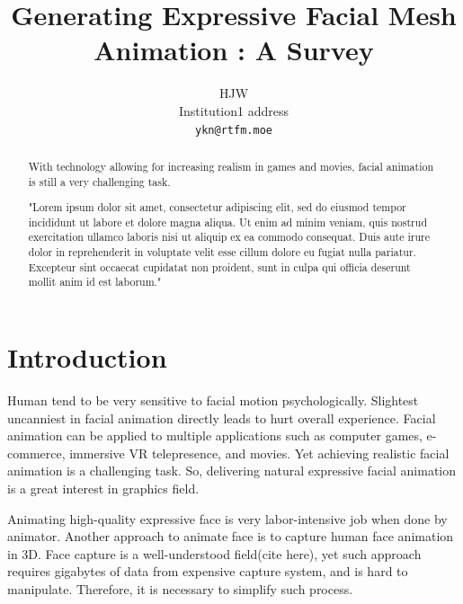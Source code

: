 \documentclass[10pt,twocolumn,letterpaper]{article}
\begin{document}
\title{Generating Expressive Facial Mesh Animation : A Survey}

\author{
HJW\\
Institution1 address\\
{\tt\small ykn@rtfm.moe}
}
\maketitle

\begin{abstract}
With technology allowing for increasing realism in games and movies, facial animation is still a very challenging task. 

"Lorem ipsum dolor sit amet, consectetur adipiscing elit, sed do eiusmod tempor incididunt ut labore et dolore magna aliqua. Ut enim ad minim veniam, quis nostrud exercitation ullamco laboris nisi ut aliquip ex ea commodo consequat. Duis aute irure dolor in reprehenderit in voluptate velit esse cillum dolore eu fugiat nulla pariatur. Excepteur sint occaecat cupidatat non proident, sunt in culpa qui officia deserunt mollit anim id est laborum."
\end{abstract}

\section{Introduction}
\label{sec:intro}

Human tend to be very sensitive to facial motion psychologically. Slightest uncanniest in facial animation directly leads to hurt overall experience\cite{hansonUpendingUncannyValley}. Facial animation can be applied to multiple applications such as computer games, e-commerce, immersive VR telepresence, and movies. Yet achieving realistic facial animation is a challenging task. So, delivering natural expressive facial animation is a great interest in graphics field.

Animating high-quality expressive face is very labor-intensive job when done by animator. Another approach to animate face is to capture human face animation in 3D. Face capture is a well-understood field(cite here), yet such approach requires gigabytes of data from expensive capture system, and is hard to manipulate. Therefore, it is necessary to simplify such process. 
\end{document}
